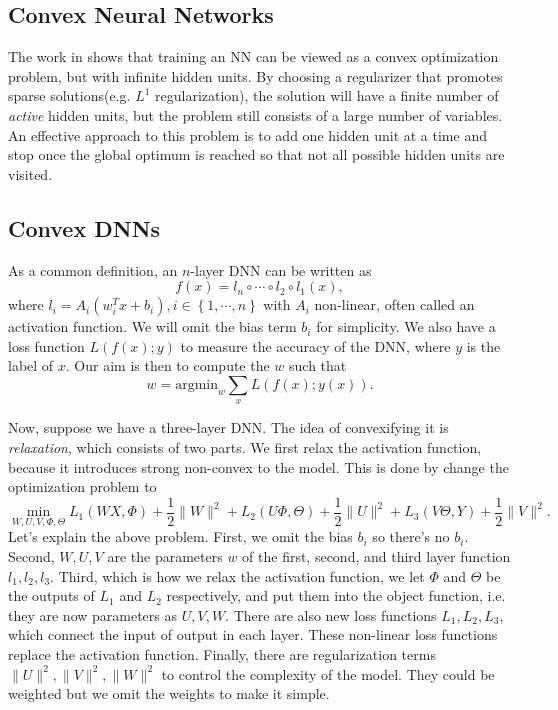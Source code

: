 \documentclass{article}
\begin{document}
\subsection{Convex Neural Networks}
The work in \cite{bengio2006convex} shows that training an NN can be viewed as a convex optimization problem, but with infinite hidden units. By choosing a regularizer that promotes sparse solutions(e.g. $L^{1}$ regularization), 
the solution will have a finite number of \emph{active} hidden units, but the problem still consists of a large number of variables. An effective approach to this problem is to add one hidden unit at a time and stop once the global optimum is reached so that not all possible hidden units are visited.
\subsection{Convex DNNs}
As a common definition, an $n$-layer DNN can be written as \[f(x)=l_n\circ\cdots\circ l_2\circ l_1(x),\] where $l_i=A_i(w_i^Tx+b_i),i\in\left\lbrace 1,\cdots,n\right\rbrace $ with $A_i$ non-linear, often called an activation function. We will omit the bias term $b_i$ for simplicity. We also have a loss function $L(f(x);y)$ to measure the accuracy of the DNN, where $y$ is the label of $x$. Our aim is then to compute the $w$ such that
\[w=\text{argmin}_{w}\sum_{x}L(f(x);y(x)).\]

Now, suppose we have a three-layer DNN. The idea of convexifying it is \emph{relaxation}, which consists of two parts. We first relax the activation function, because it introduces strong non-convex to the model. This is done by change the optimization problem to
\[\min_{W,U,V,\Phi,\Theta}L_1(WX,\Phi)+\frac{1}{2}\|W\|^2+L_2(U\Phi,\Theta)+\frac{1}{2}\|U\|^2+L_3(V\Theta,Y)+\frac{1}{2}\|V\|^2.\]
Let's explain the above problem. First, we omit the bias $b_i$ so there's no $b_i$. Second, $W,U,V$ are the parameters $w$ of the first, second, and third layer function $l_1,l_2,l_3$. Third, which is how we relax the activation function, we let $\Phi$ and $\Theta$ be the outputs of $L_1$ and $L_2$ respectively, and put them into the object function, i.e. they are now parameters as $U,V,W$. There are also new loss functions $L_1,L_2,L_3$, which connect the input of output in each layer. These non-linear loss functions replace the activation function. Finally, there are regularization terms $\|U\|^2,\|V\|^2,\|W\|^2$ to control the complexity of the model. They could be weighted but we omit the weights to make it simple.
\end{document}
